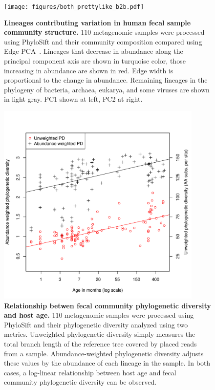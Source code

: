 \documentclass[10pt]{article}
\begin{document}
\begin{figure}[hp]
\begin{center}
\texttt{[image: figures/both\_prettylike\_b2b.pdf]}
\end{center}
\caption{\textbf{Lineages contributing variation in human fecal sample community structure.} 110 metagenomic samples were processed using PhyloSift and their community composition compared using Edge PCA~\cite{Matsen2012}. Lineages that decrease in abundance along the principal component axis are shown in turquoise color, those increasing in abundance are shown in red. Edge width is proportional to the change in abundance. Remaining lineages in the phylogeny of bacteria, archaea, eukarya, and some viruses are shown in light gray. PC1 shown at left, PC2 at right.}
\label{fig:pcaphylo}
\end{figure}

\begin{figure}[hp]
\begin{center}
\includegraphics[width=4in]{figures/phylo_diversity.pdf}
\end{center}
\caption{\textbf{Relationship betwen fecal community phylogenetic diversity and host age.} 110 metagenomic samples were processed using PhyloSift and their phylogenetic diversity analyzed using two metrics. Unweighted phylogenetic diversity simply measures the total branch length of the reference tree covered by placed reads from a sample. Abundance-weighted phylogenetic diversity adjusts these values by the abundance of each lineage in the sample. In both cases, a log-linear relationship between host age and fecal community phylogenetic diversity can be observed.}
\label{fig:pcaphylo}
\end{figure}
\end{document}
